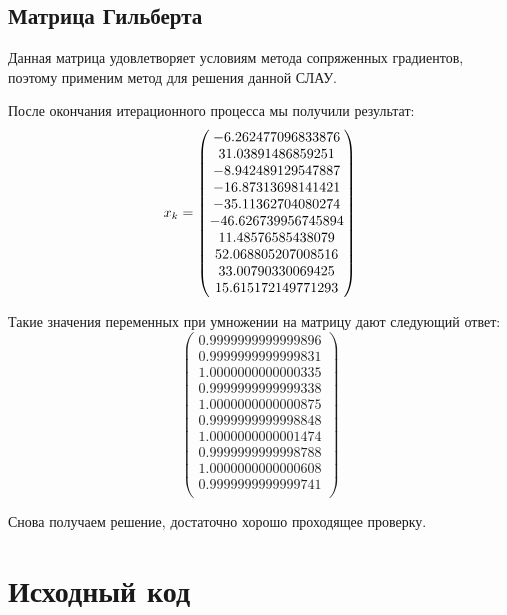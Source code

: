 \documentclass[../../report.tex]{subfiles}
\begin{document}
\subsection{Матрица Гильберта}
Данная матрица удовлетворяет условиям метода сопряженных градиентов, поэтому применим
метод для решения данной СЛАУ.

После окончания итерационного процесса мы получили результат:
\[
x_{k} = \begin{pmatrix} -6.262477096833876 \\ 31.03891486859251 \\ -8.942489129547887 \\ -16.87313698141421 \\ -35.11362704080274 \\ -46.626739956745894 \\ 11.48576585438079 \\ 52.068805207008516 \\ 33.00790330069425 \\ 15.615172149771293 \\ \end{pmatrix}
\]

Такие значения переменных при умножении на матрицу дают следующий ответ:
\[
\begin{pmatrix}
    0.9999999999999896 \\
    0.9999999999999831 \\
    1.0000000000000335 \\
    0.9999999999999338 \\
    1.0000000000000875 \\
    0.9999999999998848 \\
    1.0000000000001474 \\
    0.9999999999998788 \\
    1.0000000000000608 \\
    0.9999999999999741 \\
\end{pmatrix}
\]

Снова получаем решение, достаточно хорошо проходящее проверку.

\section{Исходный код}
\end{document}
